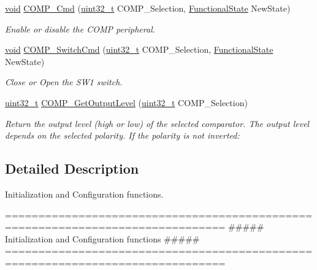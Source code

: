 \begin{DoxyCompactItemize}
\hyperlink{group___n_a_m_e_ga18028b8badbf1ea7e704ccac3c488e82}{void} \hyperlink{group___c_o_m_p___group1_gaccdc7ecae9583fb215cf3dd33374f6ce}{C\-O\-M\-P\-\_\-\-Cmd} (\hyperlink{stdint_8h_a435d1572bf3f880d55459d9805097f62}{uint32\-\_\-t} C\-O\-M\-P\-\_\-\-Selection, \hyperlink{group___exported__types_gac9a7e9a35d2513ec15c3b537aaa4fba1}{Functional\-State} New\-State)
\begin{DoxyCompactList}\small\item\em Enable or disable the C\-O\-M\-P peripheral. \end{DoxyCompactList}\item 
\hyperlink{group___n_a_m_e_ga18028b8badbf1ea7e704ccac3c488e82}{void} \hyperlink{group___c_o_m_p___group1_gafc3f93a951a85218b29cac3d35f9cf7b}{C\-O\-M\-P\-\_\-\-Switch\-Cmd} (\hyperlink{stdint_8h_a435d1572bf3f880d55459d9805097f62}{uint32\-\_\-t} C\-O\-M\-P\-\_\-\-Selection, \hyperlink{group___exported__types_gac9a7e9a35d2513ec15c3b537aaa4fba1}{Functional\-State} New\-State)
\begin{DoxyCompactList}\small\item\em Close or Open the S\-W1 switch. \end{DoxyCompactList}\item 
\hyperlink{stdint_8h_a435d1572bf3f880d55459d9805097f62}{uint32\-\_\-t} \hyperlink{group___c_o_m_p___group1_ga0287e10033f3485e7bacc2bd72dadb7d}{C\-O\-M\-P\-\_\-\-Get\-Output\-Level} (\hyperlink{stdint_8h_a435d1572bf3f880d55459d9805097f62}{uint32\-\_\-t} C\-O\-M\-P\-\_\-\-Selection)
\begin{DoxyCompactList}\small\item\em Return the output level (high or low) of the selected comparator. The output level depends on the selected polarity. If the polarity is not inverted\-: \end{DoxyCompactList}\end{DoxyCompactItemize}


\subsection{Detailed Description}
Initialization and Configuration functions. \begin{DoxyVerb} ===============================================================================
            ##### Initialization and Configuration functions #####
 ===============================================================================  \end{DoxyVerb}
 

